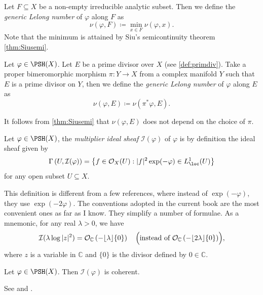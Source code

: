 \begin{definition}\label{def:pshfunctions:L1101}
    Let $F\subseteq X$ be a non-empty irreducible analytic subset. Then we define the \emph{generic Lelong number} of $\varphi$ along $F$ as
    \[
    \nu(\varphi,F)\coloneqq \min_{x\in F}\nu(\varphi,x).
    \]
    Note that the minimum is attained by Siu's semicontinuity theorem \cref{thm:Siusemi}.
\end{definition}




\begin{definition}\label{def:pshfunctions:L1112}
    Let $\varphi\in \PSH(X)$.
    Let $E$ be a prime divisor over $X$ (see \cref{def:primdiv}). Take a proper bimeromorphic morphism $\pi\colon Y\rightarrow X$ from a complex manifold $Y$ such that $E$ is a prime divisor on $Y$, then we define the \emph{generic Lelong number} of $\varphi$ along $E$ as
    \[
        \nu(\varphi,E)\coloneqq \nu(\pi^*\varphi,E).
    \]
\end{definition}
It follows from \cref{thm:Siusemi} that $\nu(\varphi,E)$ does not depend on the choice of $\pi$.

\begin{definition}\label{def:pshfunctions:L1122}
Let $\varphi\in \PSH(X)$, the \emph{multiplier ideal sheaf}  $\mathcal{I}(\varphi)$  of $\varphi$ is by definition the ideal sheaf given by
\[
\Gamma\left(U,\mathcal{I}(\varphi)\right)=\left\{ f\in \mathcal{O}_X(U) : |f|^2\exp(-\varphi)\in L^1_{\loc}(U) \right\}
\]
for any open subset $U\subseteq X$.
\end{definition}

\begin{remark}\label{rmk:misconv}
This definition is different from a few references, where instead of $\exp(-\varphi)$, they use $\exp(-2\varphi)$. The conventions adopted in the current book are the most convenient ones as far as I know. They simplify a number of formulae. As a mnemonic, for any real $\lambda>0$, we have
\[
\mathcal{I}(\lambda \log |z|^2)=\mathcal{O}_{\mathbb{C}}\left(-\lfloor \lambda \rfloor \{0\}\right)\quad \Bigl(\textup{instead of }\mathcal{O}_{\mathbb{C}}\left(-\lfloor 2\lambda \rfloor \{0\}\right)\Bigr),
\]
where $z$ is a variable in $\mathbb{C}$ and $\{0\}$ is the divisor defined by $0\in \mathbb{C}$.
\end{remark}

\begin{proposition}[Nadel]
    Let $\varphi\in \PSH(X)$. Then $\mathcal{I}(\varphi)$ is coherent.
\end{proposition}
See \cite[Proposition~5.7]{Dem12} and \cite[Theorem~12.2.7]{FPT}.

